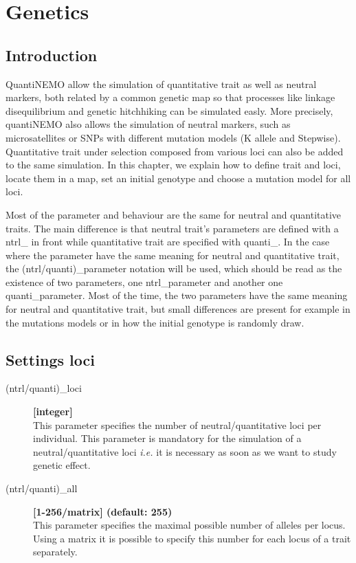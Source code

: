 \documentclass[letterpaper,12pt,oneside]{book}
\begin{document}
\chapter{Genetics}\label{chap:Genetics}
\section{Introduction}
QuantiNEMO allow the simulation of quantitative trait as well as neutral markers, both related by a common genetic map so that processes like linkage disequilibrium and genetic hitchhiking can be simulated easly. More precisely, quantiNEMO also allows the simulation of neutral markers, such as microsatellites or SNPs with different mutation models (K allele and Stepwise). Quantitative trait under selection composed from various loci can also be added to the same simulation. In this chapter, we explain how to define trait and loci, locate them in a map, set an initial genotype and choose a mutation model for all loci. 

Most of the parameter and behaviour are the same for neutral and quantitative traits. The main difference is that neutral trait's parameters are defined with a \textsf{ntrl\_} in front while quantitative trait are specified with  \textsf{quanti\_}. In the case where the parameter have the same meaning for neutral and quantitative trait, the \textsf{(ntrl/quanti)\_parameter} notation will be used, which should be read as the existence of two parameters, one \textsf{ntrl\_parameter} and another one \textsf{quanti\_parameter}.  Most of the time, the two parameters have the same meaning for neutral and quantitative trait, but small differences are present for example in the mutations models or in how the initial genotype is randomly draw. 
\section{Settings loci}
\begin{description}
\item[(ntrl/quanti)\_loci] \textbf{[integer]}\\
This parameter specifies the number of neutral/quantitative loci per individual. This parameter is mandatory for the simulation of a neutral/quantitative loci \textit{i.e.} it is necessary as soon as we want to study genetic effect.  

\item[(ntrl/quanti)\_all] \textbf{[1-256/matrix] (default: 255)}\\
This parameter specifies the maximal possible number of alleles per locus. Using a matrix it is possible to specify this number for each locus of a trait separately.
\end{description}
\end{document}

